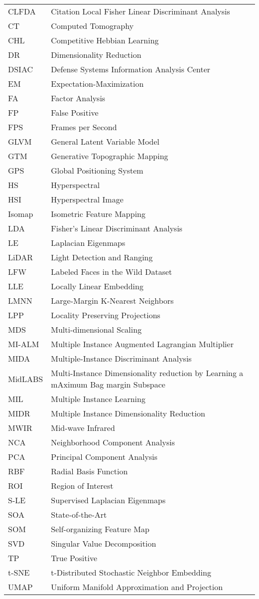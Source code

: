 \begin{tabular}{l p{5in}} %

CLFDA &  Citation Local Fisher Linear Discriminant Analysis\\
CT & Computed Tomography\\
CHL & Competitive Hebbian Learning\\
DR & Dimensionality Reduction\\
DSIAC & Defense Systems Information Analysis Center\\
EM & Expectation-Maximization\\
FA & Factor Analysis\\
FP & False Positive\\ 
FPS & Frames per Second\\
GLVM & General Latent Variable Model\\
GTM & Generative Topographic Mapping\\
GPS & Global Positioning System\\
HS & Hyperspectral\\
HSI & Hyperspectral Image\\
Isomap & Isometric Feature Mapping\\
LDA & Fisher's Linear Discriminant Analysis\\
LE & Laplacian Eigenmaps\\
LiDAR & Light Detection and Ranging\\
LFW & Labeled Faces in the Wild Dataset\\
LLE & Locally Linear Embedding\\
LMNN & Large-Margin K-Nearest Neighbors\\
LPP & Locality Preserving Projections\\
MDS & Multi-dimensional Scaling\\
MI-ALM & Multiple Instance Augmented Lagrangian Multiplier\\
MIDA & Multiple-Instance Discriminant Analysis\\
MidLABS & Multi-Instance Dimensionality reduction by Learning a mAximum Bag margin Subspace\\
MIL & Multiple Instance Learning\\
MIDR & Multiple Instance Dimensionality Reduction\\
MWIR & Mid-wave Infrared\\
NCA & Neighborhood Component Analysis\\
PCA & Principal Component Analysis\\
RBF & Radial Basis Function\\
ROI & Region of Interest\\
S-LE & Supervised Laplacian Eigenmaps\\
SOA & State-of-the-Art\\
SOM & Self-organizing Feature Map\\
SVD & Singular Value Decomposition\\
TP & True Positive\\
t-SNE & t-Distributed Stochastic Neighbor Embedding\\
UMAP & Uniform Manifold Approximation and Projection\\

 \end{tabular}



\doublespacing


